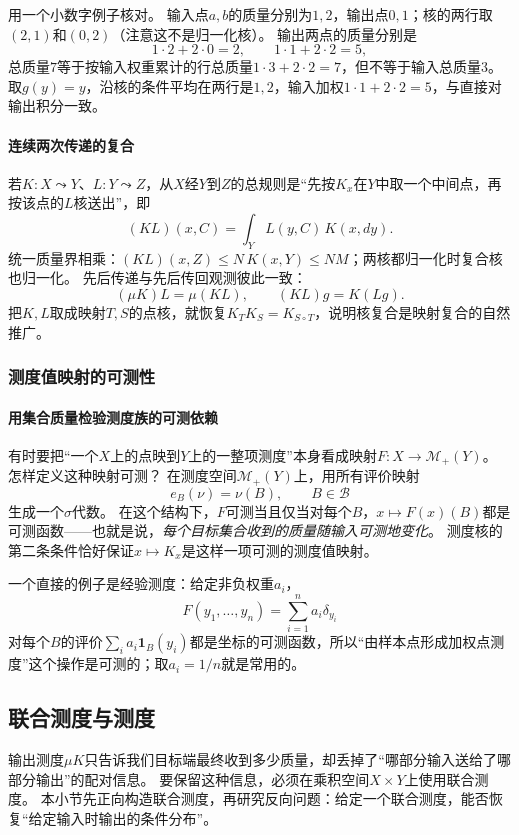 用一个小数字例子核对。
输入点$a,b$的质量分别为$1,2$，输出点$0,1$；核的两行取$(2,1)$和$(0,2)$（注意这不是归一化核）。
输出两点的质量分别是
\[
 1\cdot2+2\cdot0=2,\qquad 1\cdot1+2\cdot2=5,
\]
总质量$7$等于按输入权重累计的行总质量$1\cdot3+2\cdot2=7$，但不等于输入总质量$3$。
取$g(y)=y$，沿核的条件平均在两行是$1,2$，输入加权$1\cdot1+2\cdot2=5$，与直接对输出积分一致。

\paragraph{连续两次传递的复合}

若$K:X\leadsto Y$、$L:Y\leadsto Z$，从$X$经$Y$到$Z$的总规则是“先按$K_x$在$Y$中取一个中间点，再按该点的$L$核送出”，即
\[
 (KL)(x,C)=\int_Y L(y,C)\,K(x,dy).
\]
统一质量界相乘：$(KL)(x,Z)\leq N\,K(x,Y)\leq NM$；两核都归一化时复合核也归一化。
先后传递与先后传回观测彼此一致：
\[
 (\mu K)L=\mu(KL),\qquad (KL)g=K(Lg).
\]
把$K,L$取成映射$T,S$的点核，就恢复$K_TK_S=K_{S\circ T}$，说明核复合是映射复合的自然推广。

\subsubsection{测度值映射的可测性}

\paragraph{用集合质量检验测度族的可测依赖}

有时要把“一个$X$上的点映到$Y$上的一整项测度”本身看成映射$F:X\to\mathcal M_+(Y)$。
怎样定义这种映射可测？
在测度空间$\mathcal M_+(Y)$上，用所有评价映射
\[
 e_B(\nu)=\nu(B),\qquad B\in\mathcal B
\]
生成一个$\sigma$代数。
在这个结构下，$F$可测当且仅当对每个$B$，$x\mapsto F(x)(B)$都是可测函数——也就是说，\emph{每个目标集合收到的质量随输入可测地变化}。
测度核的第二条条件恰好保证$x\mapsto K_x$是这样一项可测的测度值映射。

一个直接的例子是经验测度：给定非负权重$a_i$，
\[
 F(y_1,\ldots,y_n)=\sum_{i=1}^n a_i\delta_{y_i}
\]
对每个$B$的评价$\sum_i a_i\mathbf 1_B(y_i)$都是坐标的可测函数，所以“由样本点形成加权点测度”这个操作是可测的；取$a_i=1/n$就是常用的。

\subsection{联合测度与测度}

输出测度$\mu K$只告诉我们目标端最终收到多少质量，却丢掉了“哪部分输入送给了哪部分输出”的配对信息。
要保留这种信息，必须在乘积空间$X\times Y$上使用联合测度。
本小节先正向构造联合测度，再研究反向问题：给定一个联合测度，能否恢复“给定输入时输出的条件分布”。

